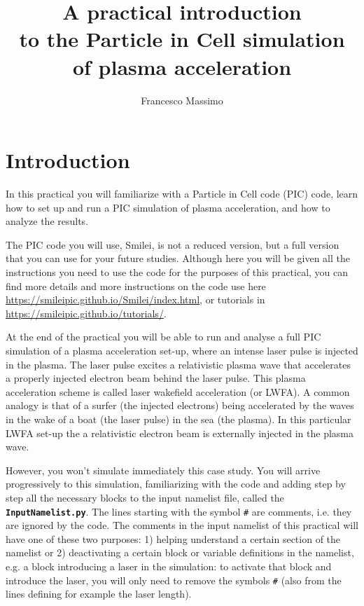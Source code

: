 \documentclass{article}
\title{\vspace{-2.cm}A practical introduction \\to the Particle in Cell simulation \\of plasma acceleration}
\author{Francesco Massimo
}
\newcommand{\smilei}{{\sc Smilei}\xspace}
\newcommand{\commandline}[1]{\texttt{\textbf{#1}}}
\begin{document}
\maketitle

\tableofcontents

\section{Introduction} %
In this practical you will familiarize with a Particle in Cell code (PIC) code, learn how to set up and run a PIC simulation of plasma acceleration, and how to analyze the results.

The PIC code you will use, \smilei, is not a reduced version, but a full version that you can use for your future studies. Although here you will be given all the instructions you need to use the code for the purposes of this practical, you can find more details and more instructions on the code use here \url{https://smileipic.github.io/Smilei/index.html}, or tutorials in \url{https://smileipic.github.io/tutorials/}.

At the end of the practical you will be able to run and analyse a full PIC simulation of a plasma acceleration set-up, where an intense laser pulse is injected in the plasma. The laser pulse excites a relativistic plasma wave that accelerates a properly injected electron beam behind the laser pulse.  This plasma acceleration scheme is called laser wakefield acceleration (or LWFA).  A common analogy is that of a surfer (the injected electrons) being accelerated by the waves in the wake of a boat (the laser pulse) in the sea (the plasma).  In this particular LWFA set-up the a relativistic electron beam is externally injected in the plasma wave.

However, you won't simulate immediately this case study.  You will arrive progressively to this simulation, familiarizing with the code and adding step by step all the necessary blocks to the input namelist file, called the \commandline{InputNamelist.py}. The lines starting with the symbol \texttt{\#} are comments, i.e. they are ignored by the code. The comments in the input namelist of this practical will have one of these two purposes: 1) helping understand a certain section of the namelist or 2) deactivating a certain block or variable definitions in the namelist, e.g. a block introducing a laser in the simulation: to activate that block and introduce the laser, you will only need to remove the symbols \texttt{\#} (also from the lines defining for example the laser length).
\end{document}
